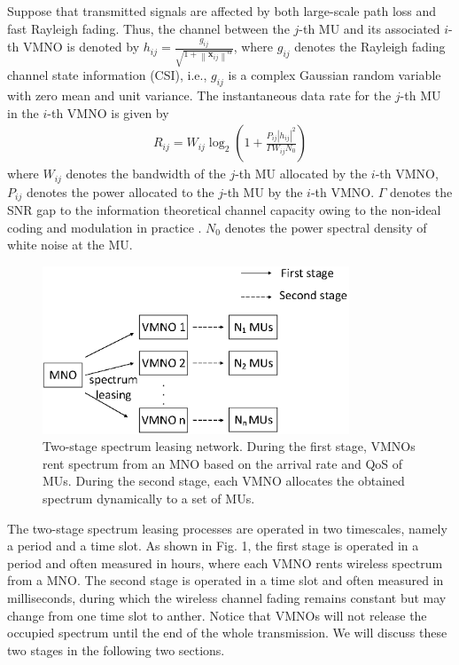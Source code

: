 \documentclass[journal]{IEEEtran}
\begin{document}
Suppose that transmitted signals are affected by both large-scale path loss and fast Rayleigh fading. Thus, the channel between the $j$-th MU and its associated $i$-th VMNO is denoted by $h_{ij} = \frac{g_{ij}}{\sqrt{1 + {\left\| \mathbf{x}_{ij} \right\|}^\alpha}}$, where $g_{ij}$ denotes the Rayleigh fading channel state information (CSI), i.e., $g_{ij}$ is a complex Gaussian random variable with zero mean and unit variance. The instantaneous data rate for the $j$-th MU in the $i$-th VMNO is given by
\begin{align}
	R_{ij} = W_{ij}\log_2\left(1 + \frac{P_{ij} \left|h_{ij} \right|^2 }{\Gamma W_{ij}N_0}\right)
\end{align}
where $W_{ij}$ denotes the bandwidth of the $j$-th MU allocated by the $i$-th VMNO, $P_{ij}$ denotes the power allocated to the $j$-th MU by the $i$-th VMNO. $\Gamma$ denotes the SNR gap to the information theoretical channel capacity owing to the
non-ideal coding and modulation in practice \cite{JGDForney}. $N_0$ denotes the power spectral density of white noise at the MU.                      
\begin{figure}
	\centering
	\includegraphics[width=3.6in]{Pic1.eps}
	\caption{Two-stage spectrum leasing network. During the first stage, VMNOs rent spectrum from an MNO based on the arrival rate and QoS of MUs. During the second stage, each VMNO allocates the obtained spectrum dynamically to a set of MUs.}
\end{figure}

The two-stage spectrum leasing processes are operated in two timescales, namely a period and a time slot. As shown in Fig. 1, the first stage is operated in a period and often measured in hours, where each VMNO rents wireless spectrum from a MNO. The second stage is operated in a time slot and often measured in milliseconds, during which the  wireless channel fading remains constant but may change from one time slot to anther. Notice that VMNOs will not release the occupied spectrum until the end of the whole transmission. We will discuss these two stages in the following two sections.
\end{document}
